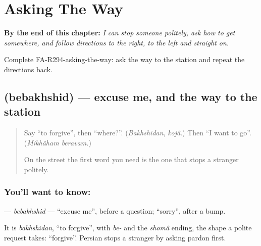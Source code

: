 
\chapter{Asking The Way}
\label{ch:fa-asking-the-way}

\begin{chapteropening}
\textbf{By the end of this chapter:} \emph{I can stop someone politely, ask how to get somewhere, and follow directions to the right, to the left and straight on.}

Complete FA-R294-asking-the-way: ask the way to the station and repeat the directions back.
\end{chapteropening}

\section[\texorpdfstring{\fa{ببخشید} (bebakhshid)}{ببخشید (bebakhshid)}]{ (bebakhshid) — excuse me, and the way to the station}

\label{lesson:FA-C294-bebakhshid}



\begin{quote}
Say \textquotedblleft{}to forgive\textquotedblright{}, then \textquotedblleft{}where?\textquotedblright{}. (\emph{Bakhshidan}, \emph{kojâ}.) Then \textquotedblleft{}I want to go\textquotedblright{}. (\emph{Mikhâham beravam.})

On the street the first word you need is the one that stops a stranger politely.
\end{quote}

\subsection*{You'll want to know: }
\textbf{} — \emph{bebakhshid} — \textquotedblleft{}excuse me\textquotedblright{}, before a question; \textquotedblleft{}sorry\textquotedblright{}, after a bump.

It is \emph{bakhshidan}, \textquotedblleft{}to forgive\textquotedblright{}, with \emph{be-} and the \emph{shomâ} ending, the shape a polite request takes: \textquotedblleft{}forgive\textquotedblright{}. Persian stops a stranger by asking pardon first.

